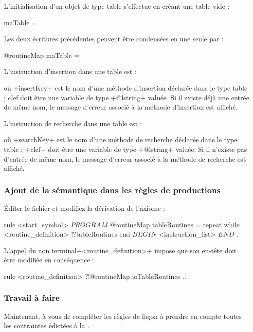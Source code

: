 L'initialisation d'un objet de type table s'effectue en créant une table vide :
\begin{galgas}
maTable = {}
\end{galgas}

Les deux écritures précédentes peuvent être condensées en une seule par :
\begin{galgas}
@routineMap maTable = {}
\end{galgas}

L'instruction d'insertion dans une table est :
\begin{galgas}
\end{galgas}
où \ggs+insertKey+ est le nom d'une méthode d'insertion déclarée dans le type table ; clef doit être une variable de type \ggs+@lstring+ valuée. Si il existe déjà une entrée de même nom, le message d'erreur associé à la méthode d'insertion est affiché.

L'instruction de recherche dans une table est :
\begin{galgas}
\end{galgas}
où \ggs+searchKey+ est le nom d'une méthode de recherche déclarée dans le type table ; \ggs+clef+ doit être une variable de type \ggs+@lstring+ valuée. Si il n'existe pas d'entrée de même nom, le message d'erreur associé à la méthode de recherche est affiché.

\subsubsection{Ajout de la sémantique dans les règles de productions}
Éditer le fichier  et modifiez la dérivation de l'axiome :

\begin{galgas}
rule <start_symbol> {
  $PROGRAM$
  @routineMap tableRoutines = {}
  repeat
  while 
    <routine_definition> !?tableRoutines
  end
  $BEGIN$
  <instruction_list>
  $END$
  $.$
}
\end{galgas}

L'appel du non terminal\ggs+<routine_definition>+ impose que son en-tête doit être modifiée en conséquence :
\begin{galgas}
rule <routine_definition> ?!@routineMap ioTableRoutines {
  ...
}
\end{galgas}

\subsubsection{Travail à faire}
Maintenant, à vous de compléter les règles de façon à prendre en compte toutes les contraintes édictées à la .

